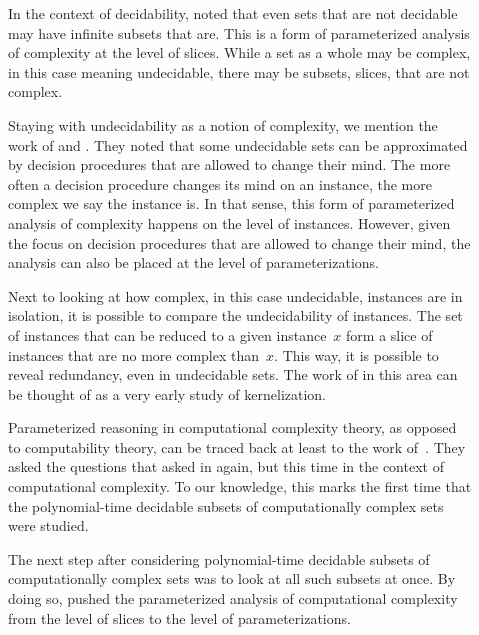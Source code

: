 \begin{description}
\item[]
  In the context of decidability, \citeauthor{post1944recursively} noted that even sets that are not decidable may have infinite subsets that are.
  This is a form of parameterized analysis of complexity at the level of slices.
  While a set as a whole may be complex, in this case meaning undecidable, there may be subsets, slices, that are not complex.
\item[{}]
  Staying with undecidability as a notion of complexity, we mention the work of \citeauthor{putnam1965trial} and \citeauthor{gold1965limiting}.
  They noted that some undecidable sets can be approximated by decision procedures that are allowed to change their mind.
  The more often a decision procedure changes its mind on an instance, the more complex we say the instance is.
  In that sense, this form of parameterized analysis of complexity happens on the level of instances.
  However, given the focus on decision procedures that are allowed to change their mind, the analysis can also be placed at the level of parameterizations.
\item[]
  Next to looking at how complex, in this case undecidable, instances are in isolation, it is possible to compare the undecidability of instances.
  The set of instances that can be reduced to a given instance~$x$ form a slice of instances that are no more complex than~$x$.
  This way, it is possible to reveal redundancy, even in undecidable sets.
  The work of \citeauthor{jockusch1968semirecursive} in this area can be thought of as a very early study of kernelization.
\item[]
  Parameterized reasoning in computational complexity theory, as opposed to computability theory, can be traced back at least to the work of~\citeauthor{flajolet1974sets}.
  They asked the questions that \citeauthor{post1944recursively} asked in \citeyear{post1944recursively} again, but this time in the context of computational complexity.
  To our knowledge, this marks the first time that the polynomial-time decidable subsets of computationally complex sets were studied.
\item[]
  The next step after considering polynomial-time decidable subsets of computationally complex sets was to look at all such subsets at once.
  By doing so, \citeauthor{lynch1975reducibility} pushed the parameterized analysis of computational complexity from the level of slices to the level of parameterizations.

\end{description}
